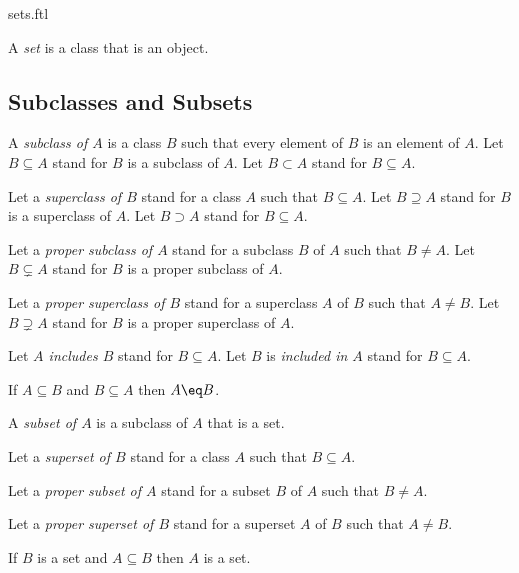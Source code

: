 \documentclass{naproche-library}
\begin{document}
\begin{smodule}{sets.ftl}
\begin{definition*}
  A \emph{set} is a class that is an object.
\end{definition*}


\subsection{Subclasses and Subsets}

\begin{definition*}[forthel,id=SubclassDef,printid]
  A \emph{subclass of $A$} is a class $B$ such that every element of $B$ is an element of $A$.
  Let $B\subseteq A$ stand for $B$ is a subclass of $A$.
  Let $B\subset A$ stand for $B\subseteq A$.

  Let a \emph{superclass of $B$} stand for a class $A$ such that $B\subseteq A$.
  Let $B\supseteq A$ stand for $B$ is a superclass of $A$.
  Let $B\supset A$ stand for $B\subseteq A$.

  Let a \emph{proper subclass of $A$} stand for a subclass $B$ of $A$ such that $B\neq A$.
  Let $B\subsetneq A$ stand for $B$ is a proper subclass of $A$.

  Let a \emph{proper superclass of $B$} stand for a superclass $A$ of $B$ such that $A \neq B$.
  Let $B\supsetneq A$ stand for $B$ is a proper superclass of $A$.

  Let \emph{$A$ includes $B$} stand for $B\subseteq A$.
  Let $B$ is \emph{included in $A$} stand for $B\subseteq A$.
\end{definition*}

\begin{axiom*}[forthel,title=Class Extensionality Axiom,id=ClassExtensionalityAx,printid]
  If $A\subseteq B$ and $B\subseteq A$ then $A\eq B$.
\end{axiom*}

\begin{definition*}[forthel,id=SubsetDef,printid]
  A \emph{subset of $A$} is a subclass of $A$ that is a set.

  Let a \emph{superset of $B$} stand for a class $A$ such that $B\subseteq A$.

  Let a \emph{proper subset of $A$} stand for a subset $B$ of $A$ such that $B\neq A$.

  Let a \emph{proper superset of $B$} stand for a superset $A$ of $B$ such that $A \neq B$.
\end{definition*}

\begin{axiom*}[forthel,title=Separation Axiom,id=SeparationAx,printid]
  If $B$ is a set and $A\subseteq B$ then $A$ is a set.
\end{axiom*}



\end{smodule}
\end{document}
